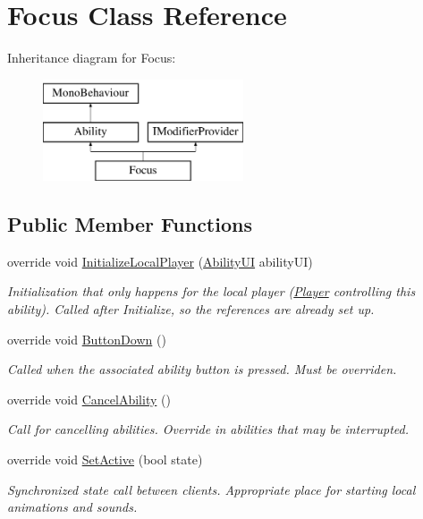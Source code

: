 \hypertarget{class_focus}{}\section{Focus Class Reference}
\label{class_focus}
Inheritance diagram for Focus\+:\begin{figure}[H]
\begin{center}
\leavevmode
\includegraphics[height=3.000000cm]{class_focus}
\end{center}
\end{figure}
\subsection*{Public Member Functions}
\begin{DoxyCompactItemize}
\item 
override void \hyperlink{class_focus_a5f64f51f4074500f2572dea35eec1610}{Initialize\+Local\+Player} (\hyperlink{class_ability_u_i}{Ability\+UI} ability\+UI)
\begin{DoxyCompactList}\small\item\em Initialization that only happens for the local player (\hyperlink{class_player}{Player} controlling this ability). Called after Initialize, so the references are already set up. \end{DoxyCompactList}\item 
override void \hyperlink{class_focus_a607e4f36f1abef12e7a4966f95bc8616}{Button\+Down} ()
\begin{DoxyCompactList}\small\item\em Called when the associated ability button is pressed. Must be overriden. \end{DoxyCompactList}\item 
override void \hyperlink{class_focus_ae3bec489a21cdf93bd302eaf01c86b4b}{Cancel\+Ability} ()
\begin{DoxyCompactList}\small\item\em Call for cancelling abilities. Override in abilities that may be interrupted. \end{DoxyCompactList}\item 
override void \hyperlink{class_focus_a18fae926f032d411999b668df6ee1d01}{Set\+Active} (bool state)
\begin{DoxyCompactList}\small\item\em Synchronized state call between clients. Appropriate place for starting local animations and sounds. \end{DoxyCompactList}\end{DoxyCompactItemize}
